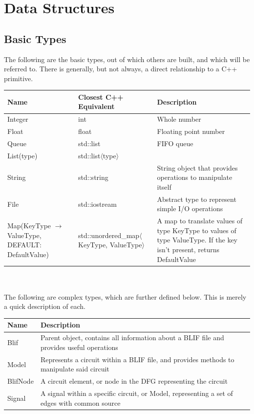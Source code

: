 \documentclass[12pt,final,oneside]{article} %
\begin{document}
\section{Data Structures}\label{secDatastructures}
\subsection{Basic Types}
The following are the basic types, out of which others are built, and which will be referred to. There is generally, but not always, a direct relationship to a C++ primitive.
\\
        \begin{tabularx}{\linewidth}{XXX}
        \toprule
        Name & Closest C++ Equivalent & Description\\
        \midrule
        Integer &  int & Whole number \\
        Float & float & Floating point number \\
        Queue & std::list & FIFO queue \\
        List(type) & std::list$\langle$type$\rangle$ & \\
        String & std::string & String object that provides operations to manipulate itself \\
        File & std::iostream & Abstract type to represent simple I/O operations \\
        Map(KeyType $\to$ ValueType, DEFAULT:  DefaultValue) & std::unordered\_map$\langle$KeyType, ValueType$\rangle$ &  A map to translate values of type KeyType to values of type ValueType. If the key isn't present, returns DefaultValue \\
        \bottomrule
        \end{tabularx}
\\
\\
The following are complex types, which are further defined below. This is merely a quick description of each.
\\
        \begin{tabularx}{\linewidth}{lX}
        \toprule
        Name & Description\\
        \midrule
        Blif & Parent object, contains all information about a BLIF file and provides useful operations \\
        Model & Represents a circuit within a BLIF file, and provides methods to manipulate said circuit \\
        BlifNode & A circuit element, or node in the DFG representing the circuit \\
        Signal & A signal within a specific circuit, or Model, representing a set of edges with common source \\
        \bottomrule
        \end{tabularx}
\end{document}
